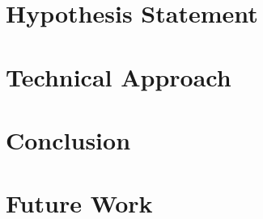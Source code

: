 \documentclass[12pt]{drexelthesis}
\begin{document}
\chapter{Hypothesis Statement}
\label{chap:hypothesis}


\chapter{Technical Approach}
\label{chap:technical}

\chapter{Conclusion}
\label{chap:conclusion}


\chapter{Future Work}
\label{chap:future}





















\pagebreak
{}
\begin{spacing}{1.0}

%
\end{spacing}

\newpage
\thispagestyle{empty}
\
                                                                                                
\end{document}
